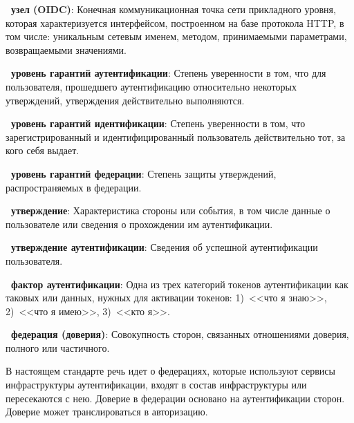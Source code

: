 {\bf \thedefctr~узел (OIDC)}:
Конечная коммуникационная точка сети прикладного уровня,
которая характеризуется интерфейсом, построенном на базе протокола HTTP,  
в том числе: уникальным сетевым именем, методом, принимаемыми параметрами,
возвращаемыми значениями.


{\bf \thedefctr~уровень гарантий аутентификации}:
Степень уверенности в том, что для пользователя, прошедшего аутентификацию
относительно некоторых утверждений, утверждения действительно выполняются.


{\bf \thedefctr~уровень гарантий идентификации}:
Степень уверенности в том, что зарегистрированный и идентифицированный
пользователь действительно тот, за кого себя выдает.


{\bf \thedefctr~уровень гарантий федерации}:
Степень защиты утверждений, распространяемых в федерации.



{\bf \thedefctr~утверждение}:
Характеристика стороны или события, в том числе данные о пользователе или
сведения о прохождении им аутентификации.

{\bf \thedefctr~утверждение аутентификации}:
Сведения об успешной аутентификации пользователя.

{\bf \thedefctr~фактор аутентификации}:
Одна из трех категорий токенов аутентификации как таковых
или данных, нужных для активации токенов:
1)~<<что я знаю>>, 2)~<<что я имею>>, 3)~<<кто я>>.


{\bf \thedefctr~федерация (доверия)}:
Совокупность сторон, связанных отношениями доверия, полного или частичного.

\begin{note*}
В настоящем стандарте речь идет о федерациях, которые используют 
сервисы инфраструктуры аутентификации, входят в состав инфраструктуры
или пересекаются с нею. 
%
Доверие в федерации основано на аутентификации сторон.
Доверие может транслироваться в авторизацию. 
\end{note*}

